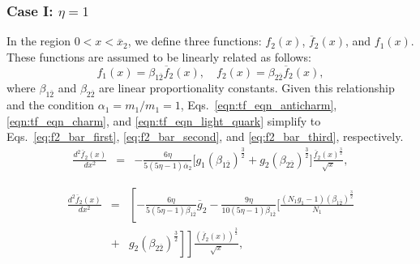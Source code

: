 \documentclass[preprint,12pt]{elsarticle}
\begin{document}
        \subsubsection{Case I: $\eta =1$}        
            In the region $0 < x < \overline{x}_{2}$, we define three functions: $f_2(x)$, $\overline{f}_{2}(x)$, and $f_1(x)$. These functions are assumed to be linearly related as follows:  
            \[
            f_1(x) = \beta_{1\overline{2}} \overline{f}_{2}(x), \quad f_2(x) = \beta_{2\overline{2}} \overline{f}_{2}(x),
            \]
            where $\beta_{1\overline{2}}$ and $\beta_{2\overline{2}}$ are linear proportionality constants. 
            Given this relationship and the condition $\alpha_1 = m_{1}/m_{1} = 1$, Eqs.~\eqref{eqn:tf_eqn_anticharm}, \eqref{eqn:tf_eqn_charm}, and \eqref{eqn:tf_eqn_light_quark} simplify to Eqs.~\eqref{eq:f2_bar_first}, \eqref{eq:f2_bar_second}, and \eqref{eq:f2_bar_third}, respectively.
            \begin{eqnarray}
                   \frac{d^2\overline{f}_{2}(x)}{dx^2} &=& -\frac{6\eta}{5(5\eta-1) \overline{\alpha}_2} \biggl[ g_1 (\beta_{1\overline{2}})^\frac{3}{2}
                   + g_2 (\beta_{2\overline{2}})^\frac{3}{2}
                    \biggr] \frac{\overline{f}_{2}(x)^\frac{3}{2}}{\sqrt{x}},
                    \label{eq:f2_bar_first}
            \end{eqnarray}
            
            \begin{eqnarray}
                  \frac{d^2 \overline{f}_{2}(x)}{dx^2} &=& \left[- \frac{6 \eta}{5 (5 \eta -1) \beta_{1\overline{2}}}\overline{g}_{2} 
                  -\frac{9\eta}{10(5\eta-1)\beta_{1\overline{2}}}
                   \biggl[\frac{(N_1 g_1-1)(\beta_{1\overline{2}})^\frac{3}{2}}{N_1} \right. \nonumber \\ 
                 &+& \left. \left. g_2 (\beta_{2\overline{2}})^\frac{3}{2} \right]\right]
                 \frac{\left( \overline{f}_2(x)\right)^\frac{3}{2}}{\sqrt{x}},
                 \label{eq:f2_bar_second}
            \end{eqnarray}
            
\end{document}
